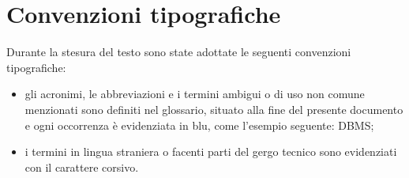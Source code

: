 \section*{Convenzioni tipografiche}
Durante la stesura del testo sono state adottate le seguenti convenzioni tipografiche:
\begin{itemize}
	\item gli acronimi, le abbreviazioni e i termini ambigui o di uso non comune menzionati
	sono definiti nel glossario, situato alla fine del presente documento e ogni
	occorrenza è evidenziata in blu, come l'esempio seguente: \gls{DBMS};
	\item i termini in lingua straniera o facenti parti del gergo tecnico sono evidenziati con
	il carattere corsivo.
\end{itemize}

%
%

\endgroup			

\vfill

